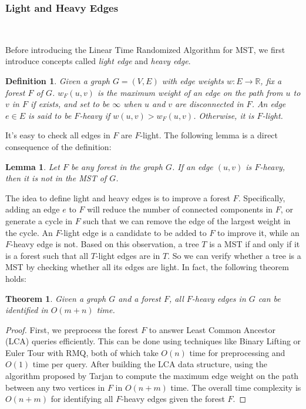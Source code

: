 \documentclass[11pt]{article}
\theoremstyle{plain}
\newtheorem{lemma}{Lemma}[section]
\newtheorem{theorem}{Theorem}[section]
\newtheorem{definition}{Definition}[section]
\begin{document}
\subsubsection{Light and Heavy Edges}\

Before introducing the Linear Time Randomized Algorithm for MST, we first introduce concepts called \textit{light edge} and \textit{heavy edge}.

\begin{definition}
    Given a graph $G=(V,E)$ with edge weights $w:E\to \mathbb{R}$, fix a forest $F$ of $G$. $w_F(u,v)$ is the maximum weight of an edge on the path from $u$ to $v$ in $F$ if exists, and set to be $\infty$ when $u$ and $v$ are disconnected in $F$. An edge $e\in E$ is said to be $F$-\textit{heavy} if $w(u,v)>w_F(u,v)$. Otherwise, it is $F$-\textit{light}.
\end{definition}

It's easy to check all edges in $F$ are $F$-light. The following lemma is a direct consequence of the definition:

\begin{lemma}
    Let $F$ be any forest in the graph $G$. If an edge $(u,v)$ is $F$-heavy, then it is not in the MST of $G$.
\end{lemma}

The idea to define light and heavy edges is to improve a forest $F$. Specifically, adding an edge $e$ to $F$ will reduce the number of connected components in $F$, or generate a cycle in $F$ such that we can remove the edge of the largest weight in the cycle. An $F$-light edge is a candidate to be added to $F$ to improve it, while an $F$-heavy edge is not. Based on this observation, a tree $T$ is a MST if and only if it is a forest such that all $T$-light edges are in $T$. So we can verify whether a tree is a MST by checking whether all its edges are light. In fact, the following theorem holds:

\begin{theorem}
    \label{theorem:heavy}
    Given a graph $G$ and a forest $F$, all $F$-heavy edges in $G$ can be identified in $O(m+n)$ time.
\end{theorem}
\begin{proof}
    First, we preprocess the forest $F$ to answer Least Common Ancestor (LCA) queries efficiently. This can be done using techniques like Binary Lifting or Euler Tour with RMQ, both of which take $O(n)$ time for preprocessing and $O(1)$ time per query\cite{bender2000lca}. After building the LCA data structure, using the algorithm proposed by Tarjan\cite{doi:10.1137/0221070} to compute the maximum edge weight on the path between any two vertices in $F$ in $O(n+m)$ time. The overall time complexity is $O(n + m)$ for identifying all $F$-heavy edges given the forest $F$.
\end{proof}
\end{document}
